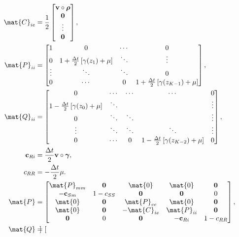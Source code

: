 \documentclass{jpmarticle}
\renewcommand{\vec}[1]{\boldsymbol{\mathrm{#1}}}
\let\subequationsorig\subequations%
\let\endsubequationsorig\endsubequations%
\renewenvironment{subequations}{
  \subequationsorig
  \renewcommand{\theequation}{\theparentequation.\arabic{equation}}
}{
  \endsubequationsorig
}
\begin{document}
\begin{subequations}
\begin{align}
    \mat{C}_{ie} &=
    \frac{1}{2}
    \begin{bmatrix}
      \vec{v} \circ \vec{\rho}
      \\
      \vec{0}
      \\
      \vdots
      \\
      \vec{0}
    \end{bmatrix},
    \\
    \mat{P}_{ii} &=
    \begin{bmatrix}
      1 & 0 & \cdots & 0
      \\
      0 & 1 + \frac{\Delta t}{2} \left[\gamma(z_1) + \mu\right] &
      \ddots & \vdots
      \\
      \vdots & \ddots & \ddots & 0
      \\
      0 & \cdots & 0 &
      1 + \frac{\Delta t}{2} \left[\gamma(z_{K - 1}) + \mu\right]
    \end{bmatrix},
    \\
    \mat{Q}_{ii} &=
    \begin{bmatrix}
      0 & \cdots & \cdots & \cdots & 0
      \\
      1 - \frac{\Delta t}{2} \left[\gamma(z_0) + \mu\right] & \ddots &
      & & \vdots
      \\
      0 & \ddots & \ddots & & \vdots
      \\
      \vdots & \ddots & \ddots & \ddots & \vdots
      \\
      0 & \cdots & 0 &
      1 - \frac{\Delta t}{2} \left[\gamma(z_{K - 2}) + \mu\right] & 0
    \end{bmatrix},
    \\
    \vec{c}_{Ri} &=
    \frac{\Delta t}{2} \vec{v} \circ \vec{\gamma},
    \\
    c_{RR} &=
    - \frac{\Delta t}{2} \mu.
    \\
    \mat{P} &=
    \begin{bmatrix}
      \mat{P}_{mm} & \vec{0} & \mat{0} & \mat{0} & \vec{0}
      \\
      - \vec{c}_{Sm} & 1 - c_{SS} & \vec{0} & \vec{0} & 0
      \\
      \mat{0} & \vec{0} & \mat{P}_{ee} & \mat{0} & \vec{0}
      \\
      \mat{0} & \vec{0} & - \mat{C}_{ie} & \mat{P}_{ii} & \vec{0}
      \\
      \vec{0} & 0 & \vec{0} & - \vec{c}_{Ri} & 1 - c_{RR}
    \end{bmatrix},
    \\
    \mat{Q} &=
    \begin{bmatrix}

\end{bmatrix}
\end{align}
\end{subequations}
\end{document}

